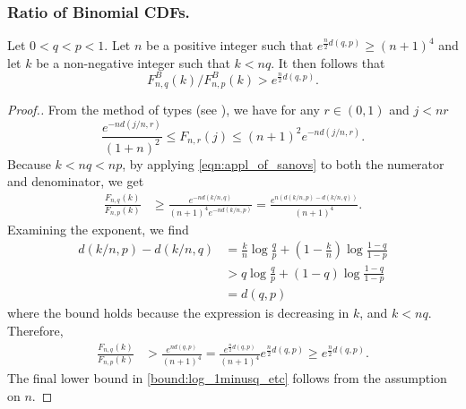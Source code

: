 \subsubsection{Ratio of Binomial CDFs.} \label{sec:ratio_of_bin_cdfs}
\begin{lemma} \label{lemma:ratio_of_cdfs}
	Let $0< q < p < 1$. Let $n$ be a positive integer such that $e^{\frac{n}{2} d(q,p)} \ge (n+1)^4$ and let $k$ be a non-negative integer such that $k < nq$. It then follows that
	\[
	F^B_{n,q}(k)/F^B_{n,p}(k) >  e^{\frac{n}{2} d(q,p)}.
	\]
\end{lemma}
\begin{proof}[Proof.]
	From the method of types  (see \cite{cover2012elements}), we have for any $r \in (0,1)$ and $j < nr$
	\begin{equation} \label{eqn:appl_of_sanovs}
	\frac{e^{-nd(j/n, r)}}{(1+n)^2}\le F_{n,r}(j) \le (n+1)^2 e^{- n d(j/n, r)}.
	\end{equation}
	Because $k < nq < np$, by applying \eqref{eqn:appl_of_sanovs} to both the numerator and denominator, we get
	\begin{align*}
	\frac{F_{n,q}(k)}{F_{n,p}(k)} & \ge  \frac{e^{-nd(k/n, q)}}{(n+1)^4 e^{- n d(k/n, p)}} = \frac{e^{n(d(k/n,p) - d(k/n,q))}}{(n+1)^4}.
	\end{align*}
	Examining the exponent, we find
	\begin{align*}
	d(k/n, p) - d(k/n,q) & = \frac{k}{n} \log \frac{q}{p} + \left(1-\frac{k}{n}\right)\log \frac{1-q}{1-p} \\
	& > q \log \frac{q}{p} + (1-q)\log \frac{1-q}{1-p} \\
	& = d(q,p)
	\end{align*}
	where the bound holds because the expression is decreasing in $k$, and $k < nq$. Therefore,
	\begin{align}
	\frac{F_{n,q}(k)}{F_{n,p}(k)} & > \frac{e^{n  d(q,p)}}{(n+1)^4} = \frac{e^{\frac{n}{2}d(q,p)}}{(n+1)^4} e^{\frac{n}{2}d(q,p)} \ge e^{\frac{n}{2}d(q,p)} \label{bound:log_1minusq_etc}.
	\end{align}
	The final lower bound in \eqref{bound:log_1minusq_etc} follows from the assumption on $n$.
\end{proof}

